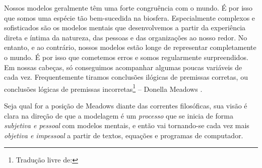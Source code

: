 \documentclass[./main.tex]{subfiles}
\begin{document}
\begin{adjustwidth}{100pt}{0pt}
\medskip
\small Nossos modelos geralmente têm uma forte congruência com o mundo. É por isso que somos uma espécie tão bem-sucedida na biosfera. Especialmente complexos e sofisticados são os modelos mentais que desenvolvemos a partir da experiência direta e íntima da natureza, das pessoas e das organizações ao nosso redor. No entanto, e ao contrário, nossos modelos estão longe de representar completamente o mundo. É por isso que cometemos erros e somos regularmente surpreendidos. Em nossas cabeças, só conseguimos acompanhar algumas poucas variáveis de cada vez. Frequentemente tiramos conclusões ilógicas de premissas corretas, ou conclusões lógicas de premissas incorretas\footnote{Tradução livre de: } -- Donella Meadows \cite{meadows2008}.
\medskip
\end{adjustwidth}

\noindent Seja qual for a posição de Meadows diante das correntes filosóficas, sua visão é clara na direção de que a modelagem é um \textit{processo} que se inicia de forma \textit{subjetiva e pessoal} com modelos mentais, e então vai tornando-se cada vez mais \textit{objetiva e impessoal} a partir de textos, equações e programas de computador. 
\end{document}
